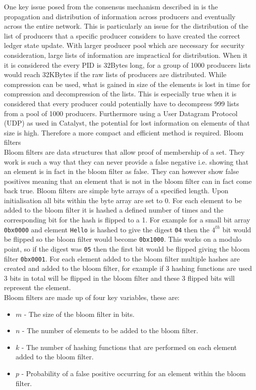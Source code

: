 One key issue posed from the consensus mechanism described in \cite{TWP} is the propagation and distribution of information across producers and eventually across the entire network. This is particularly an issue for the distribution of the list of producers   that a specific producer considers to have created the correct ledger state update. With larger producer pool which are necessary for security consideration, large lists of information are impractical for distribution. When it it is considered the every PID is 32Bytes long, for a group of 1000 producers lists would reach 32KBytes if the raw lists of producers are distributed. While compression can be used, what is gained in size of the elements is lost in time for compression and decompression of the lists. This is especially true when it is considered that every producer could potentially have to decompress 999 lists from a pool of 1000 producers. Furthermore using a User Datagram Protocol (UDP) as used in Catalyst, the potential for lost information on elements of that size is high. Therefore a more compact and efficient method is required. Bloom filters \\

Bloom filters are data structures that allow proof of membership of a set. They work is such a way that they can never provide a false negative i.e. showing that an element is in fact in the bloom filter as false. They can however show false positives meaning that an element that is not in the bloom filter can in fact come back true. Bloom filters are simple byte arrays of a specified length. Upon initialisation all bits within the byte array are set to 0. For each element to be added to the bloom filter it is hashed a defined number of times and the corresponding bit for the hash is flipped to a 1. For example for a small bit array \verb'0bx0000' and element \verb'Hello' is hashed to give the digest \verb'04' then the $4^{th}$ bit would be flipped so the bloom filter would become \verb'0bx1000'. This works on a modulo point, so if the digest was \verb'05' then the first bit would be flipped giving the bloom filter \verb'0bx0001'. For each element added to the bloom filter multiple hashes are created and added to the bloom filter, for example if 3 hashing functions are used 3 bits in total will be flipped in the bloom filter and these 3 flipped bits will represent the element. \\

Bloom filters are made up of four key variables, these are:

\begin{itemize} 
\item $m$ - The size of the bloom filter in bits.  
\item $n$ - The number of elements to be added to the bloom filter. 
\item $k$ - The number of hashing functions that are performed on each element added to the bloom filter. 
\item $p$ - Probability of a false positive occurring for an element within the bloom filter. 
\end{itemize} 

